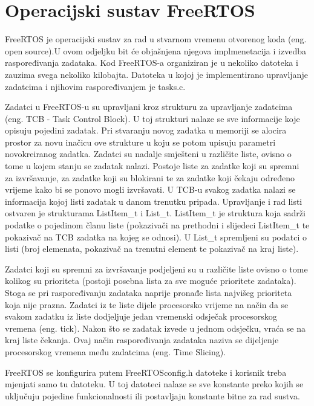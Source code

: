 \documentclass[../zavrsni.tex]{subfiles}
\begin{document}
\section{Operacijski sustav FreeRTOS}

FreeRTOS je operacijski sustav za rad u stvarnom vremenu otvorenog koda (eng. open source).U ovom odjeljku bit će objašnjena 
njegova implmenetacija i izvedba raspoređivanja zadataka. Kod FreeRTOS-a organiziran je u nekoliko datoteka i zauzima 
svega nekoliko kilobajta. Datoteka u kojoj je implementirano upravljanje zadatcima i njihovim raspoređivanjem je tasks.c.

Zadatci u FreeRTOS-u su upravljani kroz strukturu za upravljanje zadatcima (eng. TCB - Task Control Block). U toj strukturi nalaze
se sve informacije koje opisuju pojedini zadatak. Pri stvaranju novog zadatka u memoriji se alocira prostor za novu inačicu 
ove strukture u koju se potom upisuju parametri novokreiranog zadatka.
Zadatci su nadalje smješteni u različite liste, ovisno o tome u kojem stanju se zadatak nalazi. Postoje liste za zadatke koji su
spremni za izvršavanje, za zadatke koji su blokirani te za zadatke koji čekaju određeno vrijeme kako bi se ponovo mogli izvršavati.
U TCB-u svakog zadatka nalazi se informacija kojoj listi zadatak u danom trenutku pripada. Upravljanje i rad listi ostvaren je strukturama
ListItem\_t i List\_t. ListItem\_t je struktura koja sadrži podatke o pojedinom članu liste (pokazivači na prethodni i slijedeci ListItem\_t te 
pokazivač na TCB zadatka na kojeg se odnosi). U List\_t spremljeni su podatci o listi (broj elemenata, pokazivač na trenutni element te
pokazivač na kraj liste).


Zadatci koji su spremni za izvršavanje podjeljeni su u različite liste ovisno o tome kolikog su prioriteta (postoji posebna lista
 za sve moguće prioritete zadataka).
Stoga se pri raspoređivanju zadataka naprije pronađe lista najvišeg prioriteta koja nije prazna. Zadatci iz te liste dijele 
procesorsko vrijeme na način da se svakom zadatku iz liste dodjeljuje jedan vremenski odsječak procesorskog vremena (eng. tick).
Nakon što se zadatak izvede u jednom odsječku, vraća se na kraj liste čekanja. Ovaj način raspoređivanja zadataka naziva se dijeljenje
procesorskog vremena među zadatcima (eng. Time Slicing).

FreeRTOS se konfigurira putem FreeRTOSconfig.h datoteke i korisnik treba mjenjati samo tu datoteku. U toj datoteci nalaze se 
sve konstante preko kojih se uključuju pojedine funkcionalnosti ili postavljaju konstante bitne za rad sustva.  
\end{document}
